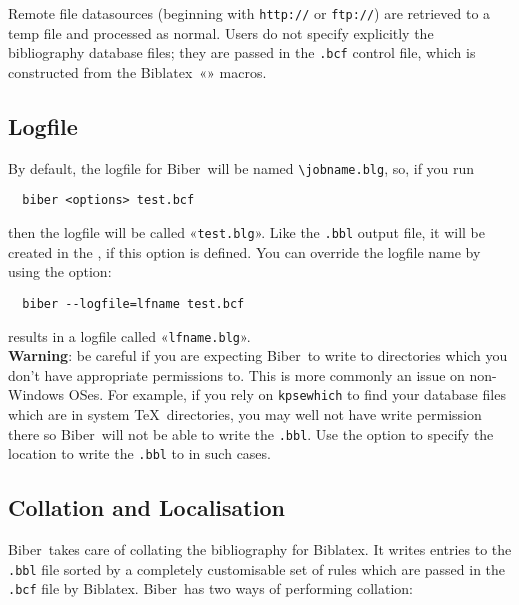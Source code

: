 \documentclass{ltxdockit}
\newcommand*{\biber}{Biber\xspace}
\newcommand*{\biblatex}{Biblatex\xspace}
\begin{document}
\noindent Remote file datasources (beginning with \verb+http://+ or
\verb+ftp://+) are retrieved to a temp file and processed as normal. Users
do not specify explicitly the bibliography database files; they are passed
in the \verb+.bcf+ control file, which is constructed from the
\biblatex\ «\verb++» macros.

\subsection{Logfile}

By default, the logfile for \biber\ will be named \verb+\jobname.blg+,
so, if you run

\begin{verbatim}
  biber <options> test.bcf
\end{verbatim}

\noindent then the logfile will be called «\verb+test.blg+». Like the
\verb+.bbl+ output file, it will be created in the
, if this option is defined. You can
override the logfile name by using the  option:

\begin{verbatim}
  biber --logfile=lfname test.bcf
\end{verbatim}

\noindent results in a logfile called «\verb+lfname.blg+».\\

\noindent \textbf{Warning}: be careful if you are expecting \biber\ to
write to directories which you don't have appropriate permissions to. This
is more commonly an issue on non-Windows OSes. For example, if you rely on
\verb+kpsewhich+ to find your database files which are in system \TeX\
directories, you may well not have write permission there so \biber\
will not be able to write the \verb+.bbl+. Use the 
option to specify the location to write the \verb+.bbl+ to in such cases.

\subsection{Collation and Localisation}\label{coll}

\biber\ takes care of collating the bibliography for
\biblatex. It writes entries to the \verb+.bbl+ file sorted by a
completely customisable set of rules which are passed in the
\verb+.bcf+ file by \biblatex. \biber\ has two ways of performing
collation:\\[2ex]
\end{document}
